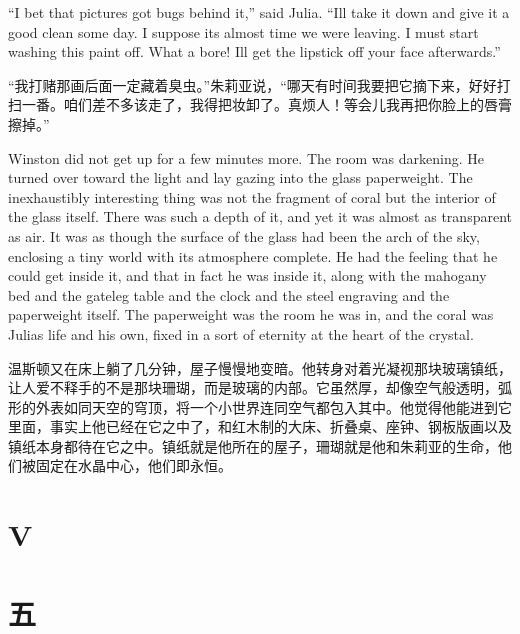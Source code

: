 \begin{paracol}{2}
\switchcolumn*

``I bet that picture\textquotesingle s got bugs behind it,'' said Julia.
``I\textquotesingle ll take it down and give it a good clean some day. I
suppose it\textquotesingle s almost time we were leaving. I must start
washing this paint off. What a bore! I\textquotesingle ll get the
lipstick off your face afterwards.''

\switchcolumn

``我打赌那画后面一定藏着臭虫。''朱莉亚说，``哪天有时间我要把它摘下来，好好打扫一番。咱们差不多该走了，我得把妆卸了。真烦人！等会儿我再把你脸上的唇膏擦掉。''

\switchcolumn*

Winston did not get up for a few minutes more. The room was darkening.
He turned over toward the light and lay gazing into the glass
paperweight. The inexhaustibly interesting thing was not the fragment of
coral but the interior of the glass itself. There was such a depth of
it, and yet it was almost as transparent as air. It was as though the
surface of the glass had been the arch of the sky, enclosing a tiny
world with its atmosphere complete. He had the feeling that he could get
inside it, and that in fact he was inside it, along with the mahogany
bed and the gateleg table and the clock and the steel engraving and the
paperweight itself. The paperweight was the room he was in, and the
coral was Julia\textquotesingle s life and his own, fixed in a sort of
eternity at the heart of the crystal.

\switchcolumn

温斯顿又在床上躺了几分钟，屋子慢慢地变暗。他转身对着光凝视那块玻璃镇纸，让人爱不释手的不是那块珊瑚，而是玻璃的内部。它虽然厚，却像空气般透明，弧形的外表如同天空的穹顶，将一个小世界连同空气都包入其中。他觉得他能进到它里面，事实上他已经在它之中了，和红木制的大床、折叠桌、座钟、钢板版画以及镇纸本身都待在它之中。镇纸就是他所在的屋子，珊瑚就是他和朱莉亚的生命，他们被固定在水晶中心，他们即永恒。

\switchcolumn*


\section{V}\label{v-1}

\switchcolumn

\section*{五}\label{ux5341ux4e09}


\end{paracol}
